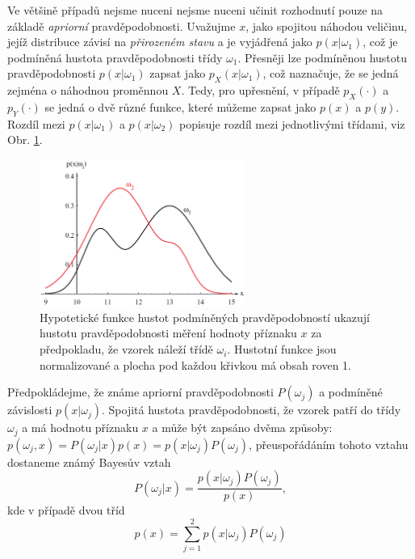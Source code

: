 \par{Ve většině případů nejsme nuceni nejsme nuceni učinit rozhodnutí pouze na základě \textit{apriorní} pravděpodobnosti. Uvažujme $x$, jako spojitou náhodou veličinu, jejíž distribuce závisí na \textit{přirozeném stavu} a je vyjádřená jako $p(x|\omega_1)$, což je podmíněná hustota pravděpodobnosti třídy $\omega_1$. Přesněji lze podmíněnou hustotu pravděpodobnosti $p(x|\omega_1)$ zapsat jako $p_X (x|\omega_1)$, což naznačuje, že se jedná zejména o náhodnou proměnnou $X$. Tedy, pro upřesnění, v případě $p_X(\cdot)$ a $p_Y(\cdot)$ se jedná o dvě různé funkce, které můžeme zapsat jako $p(x)$ a $p(y)$. Rozdíl mezi $p(x|\omega_1)$ a $p(x|\omega_2)$ popisuje rozdíl mezi jednotlivými třídami, viz Obr. \ref{fig:bayes}.} 

\begin{figure}[!ht]
	\centering
	\includegraphics[width = 0.6\textwidth]{./Img/Prednaska09/bayes/bayes.png}
	\caption{Hypotetické funkce hustot podmíněných pravděpodobností ukazují hustotu pravděpodobnosti měření hodnoty příznaku $x$ za předpokladu, že vzorek náleží třídě $\omega_i$. Hustotní funkce jsou normalizované a plocha pod každou křivkou má obsah roven 1.}
	\label{fig:bayes}
\end{figure}
\pagebreak

\par{Předpokládejme, že známe apriorní pravděpodobnosti $P(\omega_j)$ a podmíněné závislosti $p(x|\omega_j)$. Spojitá hustota pravděpodobnosti, že vzorek patří do třídy $\omega_j$ a má hodnotu příznaku $x$ a může být zapsáno dvěma způsoby: $p(\omega_j, x) = P(\omega_j|x) p(x) = p(x|\omega_j)P(\omega_j)$, přeuspořádáním tohoto vztahu dostaneme známý Bayesův vztah
\begin{equation}
	P(\omega_j|x) = \frac{p(x|\omega_j) P(\omega_j)}{p(x)},
\end{equation}
kde v případě dvou tříd
\begin{equation}
	p(x) = \sum_{j = 1}^2 p(x|\omega_j) P(\omega_j)
\end{equation}}

